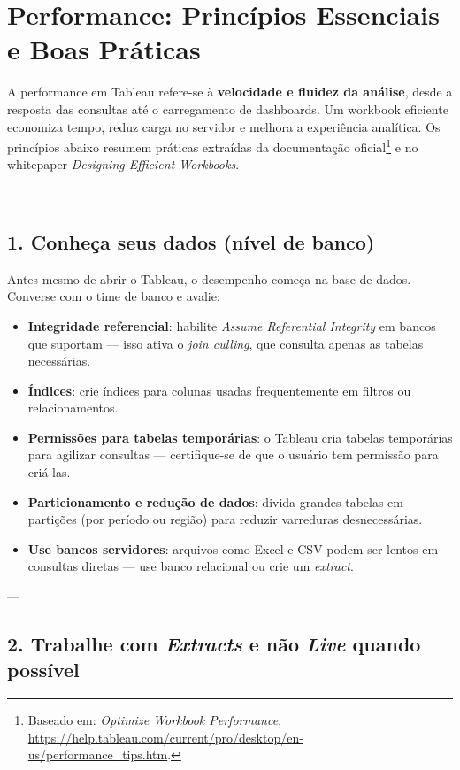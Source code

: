 \section{Performance: Princípios Essenciais e Boas Práticas}

A performance em Tableau refere-se à \textbf{velocidade e fluidez da análise}, desde a resposta das consultas até o carregamento de dashboards. Um workbook eficiente economiza tempo, reduz carga no servidor e melhora a experiência analítica.  
Os princípios abaixo resumem práticas extraídas da documentação oficial\footnote{Baseado em: \textit{Optimize Workbook Performance}, \url{https://help.tableau.com/current/pro/desktop/en-us/performance_tips.htm}.} e no whitepaper \textit{Designing Efficient Workbooks}.

---

\subsection{1. Conheça seus dados (nível de banco)}

Antes mesmo de abrir o Tableau, o desempenho começa na base de dados.  
Converse com o time de banco e avalie:

\begin{itemize}[leftmargin=*]
  \item \textbf{Integridade referencial}: habilite \textit{Assume Referential Integrity} em bancos que suportam — isso ativa o \textit{join culling}, que consulta apenas as tabelas necessárias.  
  \item \textbf{Índices}: crie índices para colunas usadas frequentemente em filtros ou relacionamentos.  
  \item \textbf{Permissões para tabelas temporárias}: o Tableau cria tabelas temporárias para agilizar consultas — certifique-se de que o usuário tem permissão para criá-las.  
  \item \textbf{Particionamento e redução de dados}: divida grandes tabelas em partições (por período ou região) para reduzir varreduras desnecessárias.  
  \item \textbf{Use bancos servidores}: arquivos como Excel e CSV podem ser lentos em consultas diretas — use banco relacional ou crie um \textit{extract}.  
\end{itemize}

---

\subsection{2. Trabalhe com \textit{Extracts} e não \textit{Live} quando possível}

